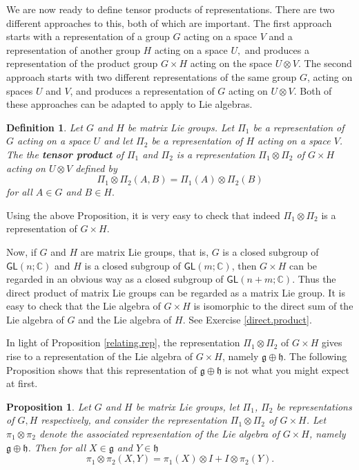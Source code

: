 \documentclass[12pt]{amsbook}
\let \frak = \mathfrak
\theoremstyle{plain}
\newtheorem{definition}[theorem]{Definition}
\newtheorem{proposition}[theorem]{Proposition}
\numberwithin{equation}{chapter}
\numberwithin{theorem}{chapter}
\begin{document}
We are now ready to define tensor products of representations. There are two
different approaches to this, both of which are important. The first approach
starts with a representation of a group $G$ acting on a space $V$ and a
representation of another group $H$ acting on a space $U,$ and produces a
representation of the product group $G\times H$ acting on the space $U\otimes
V$. The second approach starts with two different representations of the same
group $G$, acting on spaces $U$ and $V$, and produces a representation of $G$
acting on $U\otimes V$. Both of these approaches can be adapted to apply to
Lie algebras.

\begin{definition}
\label{tensor.2}Let $G$ and $H$ be matrix Lie groups. Let $\Pi_{1}$ be a
representation of $G$ acting on a space $U$ and let $\Pi_{2}$ be a
representation of $H$ acting on a space $V$. The the \textbf{tensor product}
of $\Pi_{1}$ and $\Pi_{2}$ is a representation $\Pi_{1}\otimes\Pi_{2}$ of
$G\times H$ acting on $U\otimes V$ defined by
\[
\Pi_{1}\otimes\Pi_{2}(A,B)=\Pi_{1}(A)\otimes\Pi_{2}(B)
\]
for all $A\in G$ and $B\in H.$
\end{definition}

Using the above Proposition, it is very easy to check that indeed $\Pi
_{1}\otimes\Pi_{2}$ is a representation of $G\times H$.

Now, if $G$ and $H$ are matrix Lie groups, that is, $G$ is a closed subgroup
of $\mathsf{GL}(n;\mathbb{C})$ and $H$ is a closed subgroup of $\mathsf{GL}%
(m;\mathbb{C})$, then $G\times H$ can be regarded in an obvious way as a
closed subgroup of $\mathsf{GL}(n+m;\mathbb{C})$. Thus the direct product of
matrix Lie groups can be regarded as a matrix Lie group. It is easy to check
that the Lie algebra of $G\times H$ is isomorphic to the direct sum of the Lie
algebra of $G$ and the Lie algebra of $H$. See Exercise \ref{direct.product}.

In light of Proposition \ref{relating.rep}, the representation $\Pi_{1}%
\otimes\Pi_{2}$ of $G\times H$ gives rise to a representation of the Lie
algebra of $G\times H$, namely $\frak{g}\oplus\frak{h}$. The following
Proposition shows that this representation of $\frak{g}\oplus\frak{h}$ is not
what you might expect at first.

\begin{proposition}
Let $G$ and $H$ be matrix Lie groups, let $\Pi_{1}$, $\Pi_{2}$ be
representations of $G,H$ respectively, and consider the representation
$\Pi_{1}\otimes\Pi_{2}$ of $G\times H$. Let $\pi_{1}\otimes\pi_{2}$ denote the
associated representation of the Lie algebra of $G\times H$, namely
$\frak{g}\oplus\frak{h}$. Then for all $X\in\frak{g}$ and $Y\in\frak{h}$%
\[
\pi_{1}\otimes\pi_{2}(X,Y)=\pi_{1}(X)\otimes I+I\otimes\pi_{2}(Y)\text{.}%
\]
\end{proposition}
\end{document}
